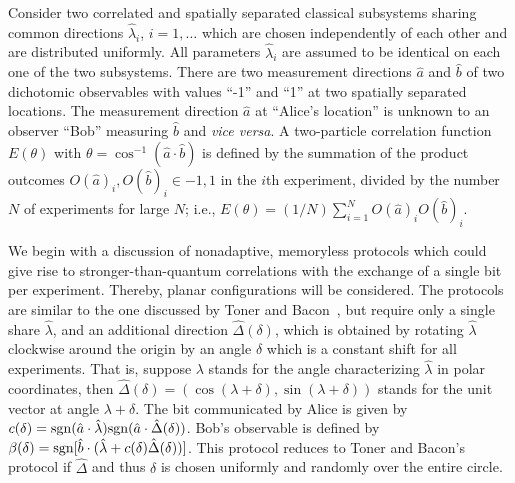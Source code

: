 \documentclass[prl,showpacs,showkeys,amsfonts,preprint]{revtex4}
\begin{document}
Consider two correlated and spatially separated classical subsystems
sharing common
directions $ {\hat \lambda }_i$, $i=1,\ldots$
which are chosen independently of each other and
 are distributed uniformly.
All parameters $ {\hat \lambda }_i$ are assumed to be identical on each one of the two subsystems.
There are two measurement directions ${\hat a}$ and ${\hat b}$
of two
dichotomic observables with values ``-1'' and ``1''
at two spatially separated locations.
The measurement direction ${\hat a}$ at ``Alice's location''
is unknown to an observer ``Bob'' measuring ${\hat b}$ and {\it vice versa}.
A two-particle correlation function $E(\theta )$
with $\theta =\cos^{-1}({\hat a}\cdot {\hat b})$
is defined by the summation of
the product outcomes $O({\hat a})_i, O({\hat b} )_i\in {-1,1}$
in the $i$th experiment, divided by the number $N$ of experiments
for large $N$; i.e.,  $E(\theta )=(1/N)\sum_{i=1}^N O({\hat a})_i O({\hat b})_i$.




We begin with a discussion of nonadaptive, memoryless protocols
which could give rise to stronger-than-quantum correlations
with the exchange of a single bit per experiment.
Thereby, planar configurations will be considered.
The protocols are similar to the one discussed by
Toner and Bacon~\cite{toner-bacon-03}, but require only a single share ${\hat \lambda }$,
and an additional direction ${\hat \Delta} (\delta )$, which is obtained by rotating
${\hat \lambda }$ clockwise around the origin by an angle $\delta$ which is a constant
shift for all experiments.
That is, suppose $\lambda$ stands for the angle
characterizing ${\hat \lambda }$ in polar coordinates,
then
${\hat \Delta} (\delta )=(\cos (\lambda +\delta ),\sin(\lambda +\delta ))$
stands for the unit vector at angle $\lambda +\delta $.
The bit communicated by Alice is given by
$
c(\delta) =
{\rm sgn}({\hat a} \cdot {\hat \lambda } )
{\rm sgn}({\hat a} \cdot {\hat \Delta} (\delta))
$.
Bob's observable is  defined by
$\beta (\delta )=  {\rm sgn}[{\hat b} \cdot ({\hat \lambda } +c(\delta){\hat \Delta} (\delta))]$.
This protocol reduces to Toner and Bacon's protocol if ${\hat \Delta}$ and thus $\delta$
is chosen uniformly and randomly  over the entire circle.
\end{document}
